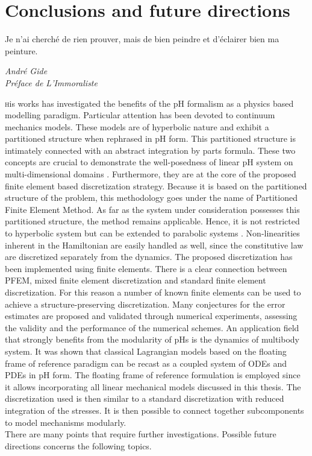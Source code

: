 \chapter*{Conclusions and future directions}

\epigraph{Je n’ai cherché de rien prouver, mais de bien peindre et d’éclairer bien ma peinture.}{\textit{André Gide \\ Préface de L'Immoraliste}}

\lettrine{\color{theme}{T}}his works has investigated the benefits of the pH formalism as a physics based modelling paradigm. Particular attention has been devoted to continuum mechanics models. These models are of hyperbolic nature and exhibit a partitioned structure when rephrased in  pH form. This partitioned structure is intimately connected with an abstract integration by parts formula. These two concepts are crucial to demonstrate the well-posedness of linear pH system on multi-dimensional domains \cite{skrepek2019wellposedness}. Furthermore, they are at the core of the proposed finite element based discretization strategy. Because it is based on the partitioned structure of the problem, this methodology goes under the name of Partitioned Finite Element Method. As far as the system under consideration possesses this partitioned structure, the method remains applicable. Hence, it is not restricted to  hyperbolic system but can be extended to parabolic systems \cite{serhani2019discretization}. Non-linearities inherent in the Hamiltonian are easily handled as well, since the constitutive law are discretized separately from the dynamics. The proposed discretization has been implemented using finite elements. There is a clear connection between PFEM, mixed finite element discretization and standard finite element discretization. For this reason a number of known finite elements can be used to achieve a structure-preserving discretization. Many conjectures for the error estimates are proposed and validated through numerical experiments, assessing the validity and the performance of the numerical schemes. An application field that strongly benefits from the modularity of pHs is the dynamics of multibody system. It was shown that classical Lagrangian models based on the floating frame of reference paradigm can be recast as a coupled system of ODEs and PDEs in pH form. The floating frame of reference formulation is employed since it allows incorporating all linear mechanical models discussed in this thesis. The discretization used is then similar to a standard discretization with reduced integration of the stresses. It is then possible to connect together subcomponents to model mechanisms modularly. \\ There are many points that require further investigations. Possible future directions concerns the following topics.



